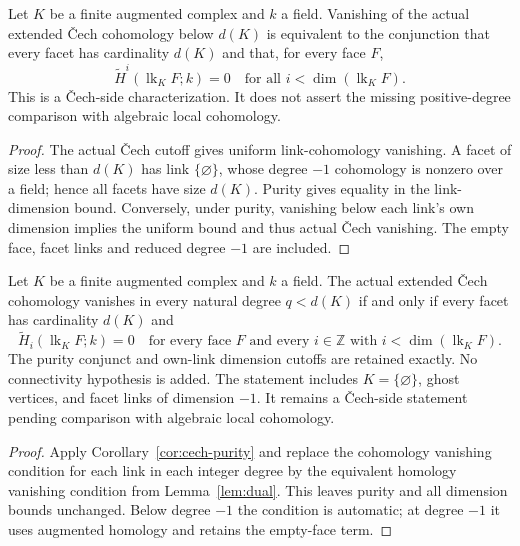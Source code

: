 \begin{corollary}\label{cor:cech-purity}
Let $K$ be a finite augmented complex and $k$ a field. Vanishing of the
actual extended Čech cohomology below $d(K)$ is equivalent to the conjunction
that every facet has cardinality $d(K)$ and that, for every face $F$,
\[
 \widetilde H^i(\operatorname{lk}_K F;k)=0
 \quad\text{for all }i<\dim(\operatorname{lk}_K F).
\]
This is a Čech-side characterization. It does not assert the missing
positive-degree comparison with algebraic local cohomology.
\leanok
\end{corollary}
\begin{proof}
The actual Čech cutoff gives uniform link-cohomology vanishing. A facet of
size less than $d(K)$ has link $\{\varnothing\}$, whose degree $-1$
cohomology is nonzero over a field; hence all facets have size $d(K)$.
Purity gives equality in the link-dimension bound. Conversely, under purity,
vanishing below each link's own dimension implies the uniform bound and thus
actual Čech vanishing. The empty face, facet links and reduced degree $-1$
are included.
\end{proof}

\begin{corollary}\label{cor:cech-purity-homology}
Let $K$ be a finite augmented complex and $k$ a field. The actual extended
Čech cohomology vanishes in every natural degree $q<d(K)$ if and only if
every facet has cardinality $d(K)$ and
\[
 \widetilde H_i(\operatorname{lk}_K F;k)=0
 \quad\text{for every face }F\text{ and every }i\in\mathbb Z
 \text{ with }i<\dim(\operatorname{lk}_K F).
\]
The purity conjunct and own-link dimension cutoffs are retained exactly.
No connectivity hypothesis is added. The statement includes
$K=\{\varnothing\}$, ghost vertices, and facet links of dimension $-1$.
It remains a Čech-side statement pending comparison with algebraic local
cohomology.
\leanok
\end{corollary}
\begin{proof}
Apply Corollary~\ref{cor:cech-purity} and replace the cohomology vanishing
condition for each link in each integer degree by the equivalent homology
vanishing condition from Lemma~\ref{lem:dual}. This leaves purity and all
dimension bounds unchanged. Below degree $-1$ the condition is automatic;
at degree $-1$ it uses augmented homology and retains the empty-face term.
\end{proof}

